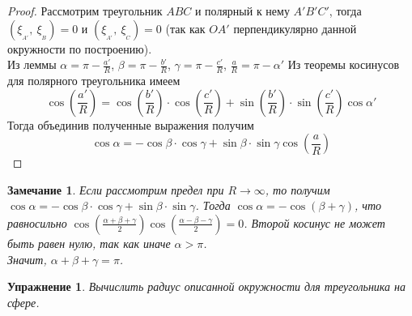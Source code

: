 \documentclass[12pt]{article}
\theoremstyle{plain}
\newtheorem*{exercise}{Упражнение}
\newtheorem{remark}{Замечание}
\begin{document}
    \begin{proof}
        Рассмотрим треугольник $ABC$ и полярный к нему $A'B'C'$, тогда $(\xi_{_{A'}}, \ \xi_{_B})=0$ и $(\xi_{_{A'}}, \ \xi_{_C})=0$ (так как $OA'$ перпендикулярно данной окружности по построению).\\
        Из леммы $\alpha=\pi-\frac{a'}{R}$, $\beta=\pi-\frac{b'}{R}$, $\gamma=\pi-\frac{c'}{R}$, $\frac{a}{R}=\pi-\alpha'$
        Из теоремы косинусов для полярного треугольника имеем
        $$\cos\left(\frac{a'}{R}\right)=\cos\left(\frac{b'}{R}\right)\cdot\cos\left(\frac{c'}{R}\right)+\sin\left(\frac{b'}{R}\right)\cdot\sin\left(\frac{c'}{R}\right)\cos\alpha'$$
        Тогда объединив полученные выражения получим
        $$\cos\alpha=-\cos\beta\cdot\cos\gamma+\sin\beta\cdot\sin\gamma\cos\left(\frac{a}{R}\right)$$
    \end{proof}
    \begin{remark}
        Если рассмотрим предел при $R\to\infty$, то получим $\cos\alpha=-\cos\beta\cdot\cos\gamma+\sin\beta\cdot\sin\gamma$. Тогда $\cos\alpha=-\cos(\beta+\gamma)$, что равносильно $\cos\left(\frac{\alpha+\beta+\gamma}{2}\right)\cos\left(\frac{\alpha-\beta-\gamma}{2}\right)=0$. Второй косинус не может быть равен нулю, так как иначе $\alpha>\pi$.\\Значит, $\alpha+\beta+\gamma=\pi$.
    \end{remark}
    \begin{exercise}
        Вычислить радиус описанной окружности для треугольника на сфере.
    \end{exercise}
\end{document}
